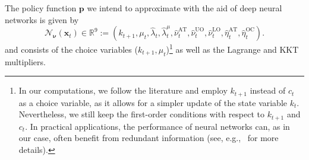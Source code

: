 \documentclass[11pt, a4paper, pdftex, twoside, dvipsnames]{article}
\newcommand{\p}{\mathbf{p}}
\newcommand{\nn}{\mathcal{N}_{\bm{\nu}}}
\newcommand{\x}{\mathbf{x}}
\begin{document}
\begin{appendices}
The policy function $\p$ we intend to approximate with the aid of deep neural networks is given by 
%
\begin{equation}
\label{eq:policy}
  \nn(\x_t)\in\mathbb{R}^{9} := \left(k_{t+1}, \mu_t, \hat{\lambda}_{t}, \hat{\lambda}^{\mu}_{t}, \hat{\nu}^{\text{AT}}_{t}, \hat{\nu}^{\text{UO}}_{t}, \hat{\nu}^{\text{LO}}_{t}, \hat{\eta}^{\text{AT}}_{t}, \hat{\eta}^{\text{OC}}_{t}     \right).
\end{equation}
%
and consists of the choice variables ($k_{t+1}, \mu_t$)\footnote{In our computations, we follow the literature and employ $k_{t+1}$ instead of $c_t$ as a choice variable, as it allows for a simpler update of the state variable $k_t$. Nevertheless, we still keep the first-order conditions with respect to $k_{t+1}$ and $c_t$. 
In practical applications, the performance of neural networks can, as in our case, often benefit from redundant information (see, e.g.,~\cite{azinovic2019Deep} for more details).} as well as the Lagrange and KKT multipliers.


\end{appendices}
\end{document}
